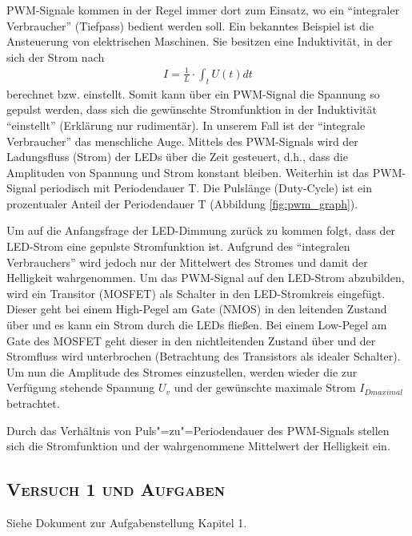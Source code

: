 PWM-Signale kommen in der Regel immer dort zum Einsatz, wo ein "`integraler Verbraucher"' (Tiefpass) bedient werden soll. Ein bekanntes Beispiel 
ist die Ansteuerung von elektrischen Maschinen. Sie besitzen eine Induktivität, in der sich der Strom nach 
\begin{align*}
I=\frac{1}{L} \cdot \int_{t}U(t)dt
\end{align*}
berechnet bzw. einstellt. 
Somit kann über ein PWM-Signal die Spannung so gepulst werden, dass sich die gewünschte Stromfunktion in der Induktivität "`einstellt"' (Erklärung nur 
rudimentär). In unserem Fall ist der "`integrale Verbraucher"' das menschliche Auge.  Mittels des PWM-Signals wird der Ladungsfluss (Strom) der LEDs über die Zeit gesteuert, d.h., dass die Amplituden von Spannung und Strom konstant bleiben.
Weiterhin ist das PWM-Signal periodisch mit Periodendauer T. Die Pulslänge (Duty-Cycle) ist ein prozentualer Anteil der Periodendauer T (Abbildung \ref{fig:pwm_graph}). 

Um auf die Anfangsfrage der LED-Dimmung zurück zu kommen folgt, dass der LED-Strom eine gepulste Stromfunktion ist. Aufgrund des "`integralen Verbrauchers"' wird jedoch nur der Mittelwert des Stromes 
und damit der Helligkeit wahrgenommen. Um das PWM-Signal auf den LED-Strom abzubilden, wird ein Transitor (MOSFET) als Schalter in den 
LED-Stromkreis eingefügt. Dieser geht bei einem High-Pegel am Gate (NMOS) in den leitenden Zustand über und es kann ein Strom durch die LEDs fließen. 
Bei einem Low-Pegel am Gate des MOSFET geht dieser in den nichtleitenden Zustand über und der Stromfluss wird unterbrochen (Betrachtung des Transistors als 
idealer Schalter). Um nun die Amplitude des Stromes einzustellen, werden wieder die zur Verfügung stehende Spannung $U_{v}$ und der gewünschte maximale
Strom $I_{Dmaximal}$ betrachtet.

Durch das Verhältnis von Puls"=zu"=Periodendauer des PWM-Signals stellen sich
die Stromfunktion und der wahrgenommene Mittelwert der Helligkeit ein.
\pagebreak

\subsection{\textsc{Versuch 1 und Aufgaben}}
Siehe Dokument zur Aufgabenstellung Kapitel 1.